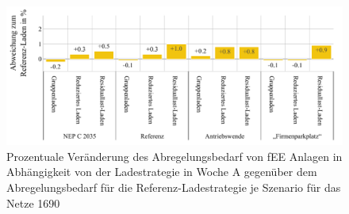 \begin{figure}[H]
    \centering
    \includegraphics[width=\textwidth]{Bilder/1690_cur_fee_grid_week_A}
    \caption{Prozentuale Veränderung des Abregelungsbedarf von fEE Anlagen in Abhängigkeit von der Ladestrategie in Woche A gegenüber dem Abregelungsbedarf für die Referenz-Ladestrategie je Szenario für das Netze \num{1690}}\label{fig:1690_cur_fee_grid_week_A}
\end{figure}